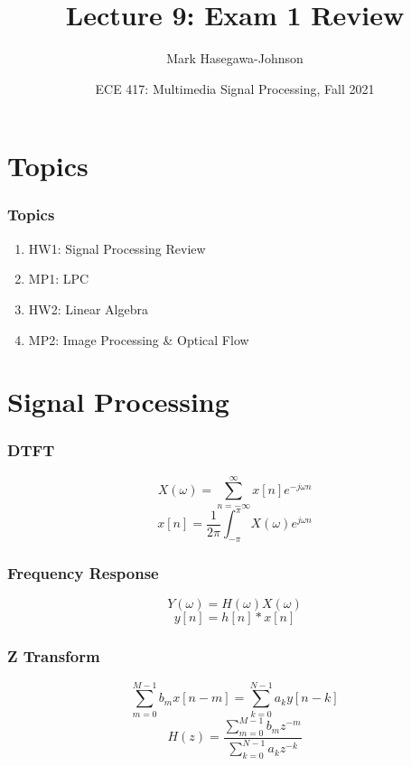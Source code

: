 \documentclass{beamer}
\title{Lecture 9: Exam 1 Review}
\author{Mark Hasegawa-Johnson}
\date{ECE 417: Multimedia Signal Processing, Fall 2021}
\begin{document}
\begin{frame}
  \maketitle
\end{frame}

\begin{frame}
  \tableofcontents
\end{frame}


\section[Topics]{Topics}
\setcounter{subsection}{1}

\begin{frame}
  \frametitle{Topics}

  \begin{enumerate}
  \item HW1: Signal Processing Review
  \item MP1: LPC
  \item HW2: Linear Algebra 
  \item MP2: Image Processing \& Optical Flow
  \end{enumerate}
\end{frame}

\section[Signal Processing]{Signal Processing}
\setcounter{subsection}{1}

\begin{frame}
  \frametitle{DTFT}

  \[
  X(\omega) = \sum_{n=-\infty}^\infty x[n]e^{-j\omega n}
  \]
  \[
  x[n] = \frac{1}{2\pi} \int_{-\pi}^\pi X(\omega)e^{j\omega n}
  \]
\end{frame}

\begin{frame}
  \frametitle{Frequency Response}

  \[
  Y(\omega) = H(\omega)X(\omega)
  \]
  \[
  y[n] = h[n]\ast x[n]
  \]
\end{frame}

\begin{frame}
  \frametitle{Z Transform}

  \[
  \sum_{m=0}^{M-1} b_m x[n-m] = \sum_{k=0}^{N-1}a_ky[n-k]
  \]
  \[
  H(z) = \frac{\sum_{m=0}^{M-1}b_m z^{-m}}{\sum_{k=0}^{N-1}a_k z^{-k}}
  \]

\end{frame}
\end{document}
